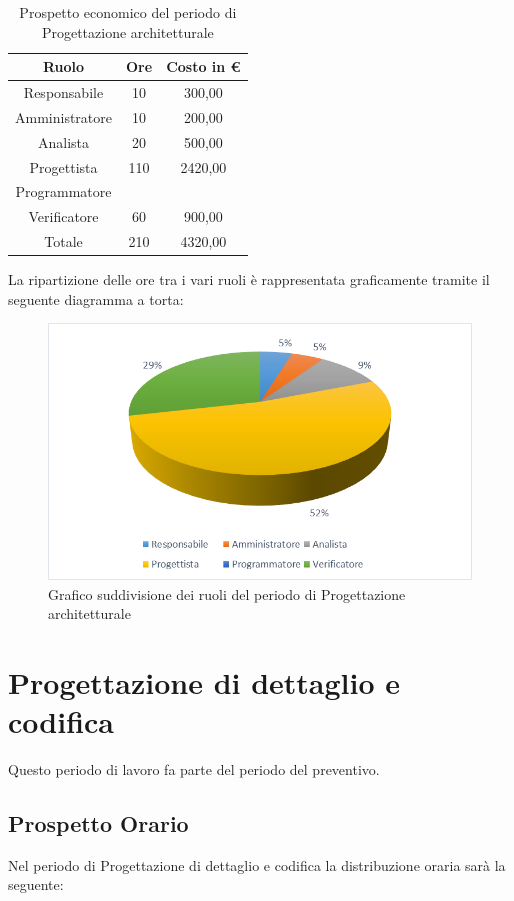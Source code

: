 \documentclass[./PianodiProgetto.tex]{subfiles}
\begin{document}
\begin{table}[H]
	\centering
	\begin{tabular}{|c|c|c|}
		\hline
		Ruolo&Ore&Costo in \euro{} \\ \hline
		Responsabile&10&300,00  \\ \hline
		Amministratore&10&200,00  \\ \hline
		Analista&20&500,00  \\ \hline
		Progettista&110&2420,00  \\ \hline
		Programmatore& &  \\ \hline
		Verificatore&60&900,00  \\ \hline
		Totale&210&4320,00 \\ \hline
	\end{tabular}
	\caption{Prospetto economico del periodo di Progettazione architetturale}
\end{table}

La ripartizione delle ore tra i vari ruoli è rappresentata graficamente tramite il seguente diagramma a torta:
\begin{figure}[H]
	\centering
	\includegraphics[width=1\linewidth]{img/grafici/ProgettazioneArchitetturaleProspettoEconomico}
	\caption{Grafico suddivisione dei ruoli del periodo di Progettazione architetturale}
	\label{fig:progettazione-architetturale-prospetto-economico}
\end{figure}

\section{Progettazione di dettaglio e codifica}
Questo periodo di lavoro fa parte del periodo del preventivo.
\subsection{Prospetto Orario}
Nel periodo di Progettazione di dettaglio e codifica la distribuzione oraria sarà la seguente:
\end{document}
